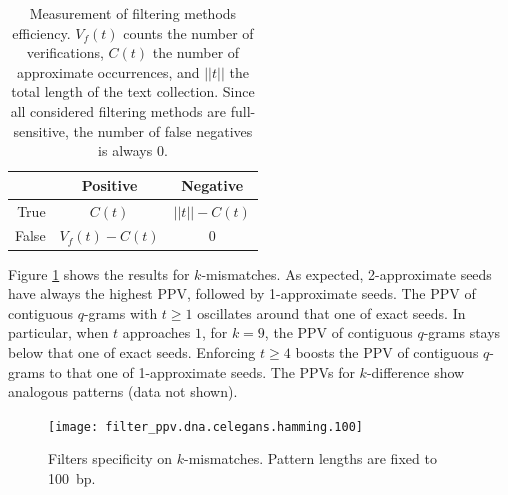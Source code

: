 \begin{table}[t]
\begin{center}
\caption[Measurement of filtering methods efficiency]{Measurement of filtering methods efficiency. $V_f(t)$ counts the number of verifications, $C(t)$ the number of approximate occurrences, and $||t||$ the total length of the text collection. Since all considered filtering methods are full-sensitive, the number of false negatives is always 0.}
\begin{tabular}{rcc}
\toprule
  & Positive & Negative\\
\midrule
True & $C(t)$ & $||t|| - C(t)$ \\
False & $V_f(t) - C(t)$ & 0		\\
\bottomrule
\end{tabular}
\label{tab:filter:ppv}
\end{center}
\end{table}

Figure \ref{fig:filter-ppv-hamming-celegans} shows the results for $k$-mismatches.
As expected, 2-approximate seeds have always the highest PPV, followed by 1-approximate seeds.
The PPV of contiguous $q$-grams with $t \geq 1$ oscillates around that one of exact seeds.
In particular, when $t$ approaches $1$, \eg for $k = 9$, the PPV of contiguous $q$-grams stays below that one of exact seeds.
Enforcing $t \geq 4$ boosts the PPV of contiguous $q$-grams to that one of 1-approximate seeds.
The PPVs for $k$-difference show analogous patterns (data not shown).

\begin{figure}[h]
\begin{center}
\caption[Filters specificity on $k$-mismatches]{Filters specificity on $k$-mismatches. Pattern lengths are fixed to 100~bp.}
\label{fig:filter-ppv-hamming-celegans}
\texttt{[image: filter\_ppv.dna.celegans.hamming.100]}
\end{center}
\end{figure}

